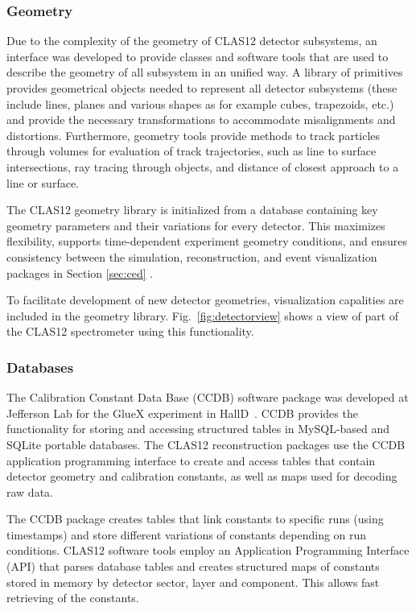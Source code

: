 \subsubsection{Geometry}

Due to the complexity of the geometry of CLAS12 detector subsystems, an interface was developed to provide classes and software tools that are used to describe the geometry of all subsystem in an unified way.  A library of primitives provides geometrical objects needed to represent all detector subsystems (these include lines, planes and various shapes as for example cubes, trapezoids, etc.) and provide the necessary transformations to accommodate misalignments and distortions.  Furthermore, geometry tools provide methods to track particles through volumes for evaluation of track trajectories, such as line to surface intersections, ray tracing through objects, and distance of closest approach to a line or surface.

The CLAS12 geometry library is initialized from a database containing key geometry parameters and their variations for every detector.  This maximizes flexibility, supports time-dependent experiment geometry conditions, and ensures consistency between the simulation, reconstruction, and event visualization packages in Section \ref{sec:ced} \cite{sim-nim}. 

To facilitate development of new detector geometries, visualization capalities are included in the geometry library. Fig.~\ref{fig:detectorview} shows a view of part of the CLAS12 spectrometer using this functionality.


\subsubsection{Databases}

The Calibration Constant Data Base (CCDB) software package was developed at Jefferson Lab for the GlueX experiment
in HallD~\cite{gluex}.  CCDB provides the functionality for storing and accessing structured tables in MySQL-based and SQLite portable databases.
The CLAS12 reconstruction packages use the CCDB application programming interface to create and access
tables that contain detector geometry and calibration constants, as well as maps used for decoding raw data.

The CCDB package creates
tables that link constants to specific runs (using timestamps) and store different variations of constants depending on run
conditions. CLAS12 software tools employ an Application Programming Interface (API) that parses database tables and creates
structured maps of constants stored in  memory by detector sector, layer and component. This allows fast retrieving of the
constants.

